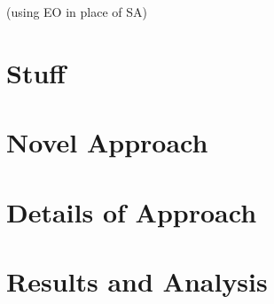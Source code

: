 \documentclass[12pt]{article}
\begin{document}
  (using EO in place of SA)


\section{Stuff} %

\section{} %

\section{} %

\section{Novel Approach} %

\section{Details of Approach}%

\section{Results and Analysis}



\end{document}
